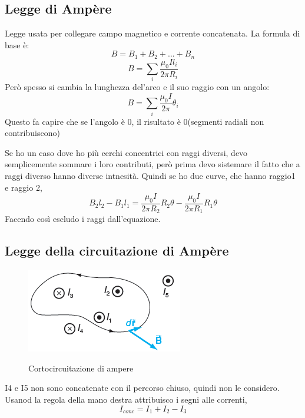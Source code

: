 \subsection{Legge di Ampère}
Legge usata per collegare campo magnetico e corrente concatenata.
La formula di base è:
\begin{equation*}
    B = B_1 + B_2 + ... + B_n
\end{equation*}
\begin{equation*}
    B = \sum_i{\frac{\mu_0Il_i}{2\pi R_i}}
\end{equation*}
Però spesso si cambia la lunghezza del'arco e il suo raggio con un angolo:
\begin{equation}
    B = \sum_i{\frac{\mu_0I}{2\pi}\theta_i}
\end{equation}
Questo fa capire che se l'angolo è 0, il risultato è 0(segmenti radiali non contribuiscono)

Se ho un caso dove ho più cerchi concentrici con raggi diversi, 
devo semplicemente sommare i loro contributi,
però prima devo sistemare il fatto che a raggi diverso hanno diverse intnesità.
Quindi se ho due curve, che hanno raggio1 e raggio 2,
\begin{equation*}
    B_2l_2-B_1l_1 = \frac{\mu_0I}{2\pi R_2}R_2\theta - 
    \frac{\mu_0I}{2\pi R_1}R_1\theta
\end{equation*}
Facendo così escludo i raggi dall'equazione.

\subsection{Legge della circuitazione di Ampère}
\begin{figure}[H]
    \centering
    \includegraphics[width=0.3\linewidth]{imgs/14 - cortocircuitazione di ampere.png}
    \label{fig:cortocircuitazione_ampere}
    \caption{Cortocircuitazione di ampere}
\end{figure}

I4 e I5 non sono concatenate con il percorso chiuso, quindi non le considero.
Usanod la regola della mano destra attribuisco i segni alle correnti,
\begin{equation*}
    I_{conc} = I_1 + I_2 - I_3
\end{equation*}

